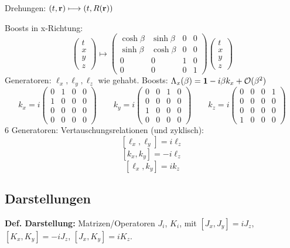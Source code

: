 \documentclass[11pt,a4paper]{report}
\begin{document}
Drehungen: $(t,\mathbf{r})\longmapsto (t,R(\mathbf{r}))$\par 
Boosts in x-Richtung:
$$\begin{pmatrix}
t \\ x \\ y \\ z
\end{pmatrix}\longmapsto\begin{pmatrix}
\cosh\beta & \sinh\beta & 0 & 0 \\
\sinh\beta & \cosh\beta & 0 & 0 \\
0 & 0 & 1 & 0 \\
0 & 0 & 0 & 1
\end{pmatrix}\begin{pmatrix}
t \\ x \\ y \\ z
\end{pmatrix}$$
Generatoren: $\ell_x, \ell_y, \ell_z$ wie gehabt. Boosts: $\Lambda_x(\beta ) = \mathbf{1} - i\beta k_x+\mathcal{O}(\beta^2)$
$$k_x=i \begin{pmatrix}
0 & 1 & 0 & 0 \\
1 & 0 & 0 & 0 \\
0 & 0 & 0 & 0 \\
0 & 0 & 0 & 0 
\end{pmatrix}\qquad k_y=i \begin{pmatrix}
0 & 0 & 1 & 0 \\
0 & 0 & 0 & 0 \\
1 & 0 & 0 & 0 \\
0 & 0 & 0 & 0 
\end{pmatrix}\qquad k_z=i \begin{pmatrix}
0 & 0 & 0 & 1 \\
0 & 0 & 0 & 0 \\
0 & 0 & 0 & 0 \\
1 & 0 & 0 & 0 
\end{pmatrix}$$
6 Generatoren:
Vertauschungsrelationen (und zyklisch):
$$[\ell_x, \ell_y]=i\ell_z$$
$$[k_x,k_y]=-i\ell_z$$
$$[\ell_x,k_y]=ik_z$$

\subsection{Darstellungen}

\textbf{Def. Darstellung:} Matrizen/Operatoren $J_i$, $K_i$, mit $[J_x,J_y]=iJ_z$, $[K_x,K_y]=-iJ_z$, $[J_x,K_y]=iK_z$.\par 
\end{document}
